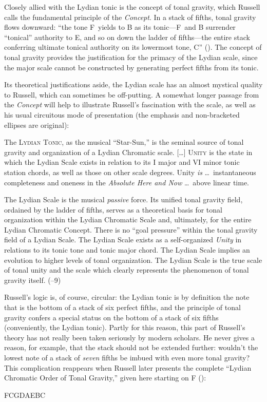 Closely allied with the Lydian tonic is the concept of tonal gravity, which
Russell calls the fundamental principle of the \emph{Concept}. In a stack of
fifths, tonal gravity flows downward: ``the tone F\sharp\ yields to B as its
tonic---F\sharp\ and B surrender ``tonical'' authority to E, and so on down the
ladder of fifths---the entire stack conferring ultimate tonical authority on
its lowermost tone, C'' ().  The concept of tonal gravity provides the
justification for the primacy of the Lydian scale, since the major scale
cannot be constructed by generating perfect fifths from its tonic.

Its theoretical justifications aside, the Lydian scale has an almost mystical
quality to Russell, which can sometimes be off-putting. A somewhat longer
passage from the \emph{Concept} will help to illustrate Russell's fascination
with the scale, as well as his usual circuitous mode of presentation (the
emphasis and non-bracketed ellipses are original):
%
\begin{quoting}
  \singlespacing
  The \textsc{Lydian Tonic}, as the musical ``Star-Sun,'' is the seminal
  source of tonal gravity and organization of a Lydian Chromatic scale.
  [\ldots] \textsc{Unity} is the state in which the Lydian Scale exists in
  relation to its I major and VI minor tonic station chords, as well as those
  on other scale degrees. Unity \emph{is} \ldots\ instantaneous completeness
  and oneness in the \emph{Absolute Here and Now} \ldots\ above linear time.

  The Lydian Scale is the musical \emph{passive} force. Its unified tonal
  gravity field, ordained by the ladder of fifths, serves as a theoretical
  basis for tonal organization within the Lydian Chromatic Scale and,
  ultimately, for the entire Lydian Chromatic Concept. There is no ``goal
  pressure'' within the tonal gravity field of a Lydian Scale. The Lydian
  Scale exists as a self-organized \emph{Unity} in relations to its tonic tone
  and tonic major chord. The Lydian Scale implies an evolution to higher
  levels of tonal organization. The Lydian Scale is the true scale of tonal
  unity and the scale which clearly represents the phenomenon of tonal gravity
  itself. (--9)
\end{quoting}

Russell's logic is, of course, circular: the Lydian tonic is by definition the
note that is the bottom of a stack of six perfect fifths, and the principle of
tonal gravity confers a special status on the bottom of a stack of six fifths
(conveniently, the Lydian tonic). Partly for this reason, this part of
Russell's theory has not really been taken seriously by modern scholars. He
never gives a reason, for example, that the stack should not be extended
further: wouldn't the lowest note of a stack of \emph{seven} fifths be imbued
with even more tonal gravity? This complication reappears when Russell later
presents the complete ``Lydian Chromatic Order of Tonal Gravity,'' given here
starting on F (): \\
{\centering F\quad C\quad G\quad D\quad A\quad E\quad B\quad C\sharp\quad
  \Aflat\quad \Eflat\quad \Bflat\quad \Gflat \par}

